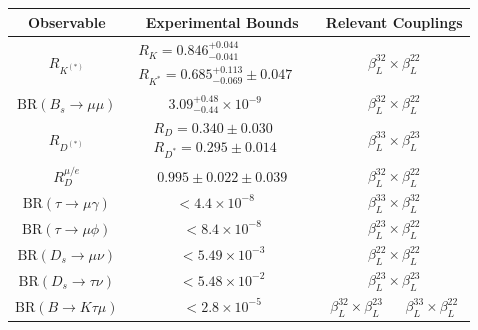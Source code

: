 \documentclass[a4paper,11pt]{article}
\begin{document}
\begin{table}[]
    \renewcommand{\arraystretch}{1.2}
    \centering
    \begin{tabular}{|c|c|c|c|}
    \hline
       Observable & Experimental Bounds & \multicolumn{2}{c|}{Relevant Couplings} \\
       \hline
        $R_{K^{(*)}}$  & $\begin{matrix} R_K = 0.846^{+0.044}_{-0.041} \\ R_{K^*} = 0.685^{+0.113}_{-0.069}\pm 0.047\end{matrix} \quad$ \cite{Aaij:2021vac, Aaij:2017vbb} & \multicolumn{2}{c|}{$\beta_L^{32} \times \beta_L^{22}$} \\
        \hline    
        $\mathrm{BR}\left(B_s \rightarrow \mu \mu \right)$ & $ 3.09^{+0.48}_{-0.44} \times 10^{-9} \quad$ \cite{Bobeth:2013uxa, LHCb:2020zud, Santimaria:2021, Altmannshofer:2021qrr}& \multicolumn{2}{c|}{$\beta_L^{32} \times \beta_L^{22}$} \\
        \hline 
        $R_{D^{(*)}}$  & $\begin{matrix} R_D = 0.340 \pm 0.030 \\ R_{D^*} = 0.295 \pm 0.014\end{matrix} \quad $ \cite{Amhis:2019ckw}  &\multicolumn{2}{c|}{ $\beta_L^{33} \times \beta_L^{23}$ } \\
        \hline
        $R_D^{\mu/e}$  & $  0.995 \pm 0.022 \pm 0.039$ \cite{Glattauer:2015teq} & \multicolumn{2}{c|}{$\beta_L^{32} \times \beta_L^{22}$ } \\
        \hline  
        $\mathrm{BR}\left(\tau \rightarrow \mu\gamma \right)$  & $ < 4.4 \times 10^{-8}\quad$  \cite{Crivellin:2018qmi} &
        \multicolumn{2}{c|}{$\beta_L^{33} \times \beta_L^{32}$} \\
        \hline     
        $\mathrm{BR}\left(\tau \rightarrow \mu\phi \right)$  & $ < 8.4 \times 10^{-8}$ & \multicolumn{2}{c|}{$\beta_L^{23} \times \beta_L^{22}$ } \\
        \hline     
        $\mathrm{BR}\left(D_s \rightarrow \mu\nu\right)$ & $ < 5.49 \times 10^{-3}$ & \multicolumn{2}{c|}{$\beta_L^{22} \times \beta_L^{22}$} \\
        \hline     
        $\mathrm{BR}\left(D_s \rightarrow \tau\nu \right)$ & $ < 5.48 \times 10^{-2}$ & \multicolumn{2}{c|}{$\beta_L^{23} \times \beta_L^{23}$ }\\
        \hline
        $\mathrm{BR}\left( B \rightarrow K \tau \mu \right)$ & $< 2.8 \times 10^{-5}$ & $\beta_L^{32} \times \beta_L^{23}$ & $\beta_L^{33} \times \beta_L^{22}$ \\

\end{tabular}
\end{table}
\end{document}
